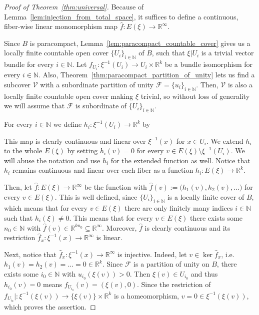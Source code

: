 \begin{proof}[Proof of Theorem~\ref{thm:universal}] Because of Lemma~\ref{lem:injection_from_total_space}, it suffices to define a continuous, fiber-wise linear monomorphism map $\hat{f}:E(\xi)\to\mathbb{R}^{\infty}$.

Since $B$ is paracompact, Lemma~\ref{lem:paracompact_countable_cover} gives us a locally finite countable open cover $\{U_i\}_{i\in\mathbb{N}}$ of $B$, such that $\xi|U_i$ is a trivial vector bundle for every $i\in\mathbb{N}$. Let $f_{U_i}:\xi^{-1}(U_i)\to U_i\times\mathbb{R}^k$ be a bundle isomorphism for every $i\in\mathbb{N}$. Also, Theorem~\ref{thm:paracompact_partition_of_unity} lets us find a subcover $\mathcal{V}$ with a subordinate partition of unity $\mathcal{F}=\{u_i\}_{i\in\mathbb{N}}$. Then, $\mathcal{V}$ is also a locally finite countable open cover making $\xi$ trivial, so without loss of generality we will assume that $\mathcal{F}$ is subordinate of $\{U_i\}_{i\in\mathbb{N}}$.

For every $i\in\mathbb{N}$ we define $h_i:\xi^{-1}(U_i)\to\mathbb{R}^k$ by
\begin{center}
\end{center}
This map is clearly continuous and linear over $\xi^{-1}(x)$ for $x\in U_i$. We extend $h_i$ to the whole $E(\xi)$ by setting $h_i(v)=0$ for every $v\in E(\xi)\setminus\xi^{-1}(U_i)$. We will abuse the notation and use $h_i$ for the extended function as well. Notice that $h_i$ remains continuous and linear over each fiber as a function $h_i:E(\xi)\to\mathbb{R}^k$.

Then, let $\hat{f}:E(\xi)\to\mathbb{R}^{\infty}$ be the function with $\hat{f}(v):=\big(h_1(v),h_2(v),\ldots\big)$ for every $v\in E(\xi)$. This is well defined, since $\{U_i\}_{i\in\mathbb{N}}$ is a locally finite cover of $B$, which means that for every $v\in E(\xi)$ there are only finitely many indices $i\in\mathbb{N}$ such that $h_i(\xi)\neq0$. This means that for every $v\in E(\xi)$ there exists some $n_0\in\mathbb{N}$ with $\hat{f}(v)\in\mathbb{R}^{kn_0}\subseteq\mathbb{R}^{\infty}$. Moreover, $\hat{f}$ is clearly continuous and its restriction $\hat{f}_x:\xi^{-1}(x)\to\mathbb{R}^{\infty}$ is linear.

Next, notice that $\hat{f}_x:\xi^{-1}(x)\to\mathbb{R}^{\infty}$ is injective. Indeed, let $v\in\ker\hat{f}_x$, i.e. $h_1(v)=h_2(v)=\ldots=0\in\mathbb{R}^k$. Since $\mathcal{F}$ is a partition of unity on $B$, there exists some $i_0\in\mathbb{N}$ with $u_{i_0}(\xi(v))>0$. Then $\xi(v)\in U_{i_0}$ and thus $h_{i_0}(v)=0$ means $f_{U_{i_0}}(v)=(\xi(v),0)$. Since the restriction of $f_{U_{i_0}}|:\xi^{-1}(\xi(v))\to\{\xi(v)\}\times\mathbb{R}^k$ is a homeomorphism, $v=0\in\xi^{-1}(\xi(v))$, which proves the assertion.
\end{proof}

